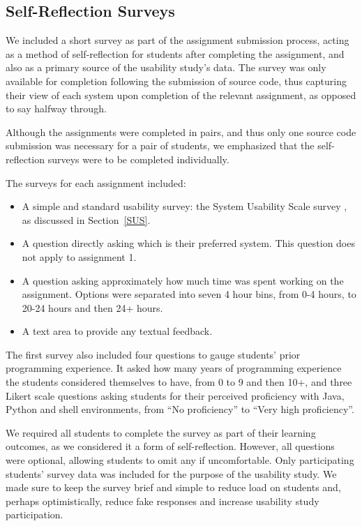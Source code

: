 \subsection{Self-Reflection Surveys}

  We included a short survey as part of the assignment submission process, acting as a method of self-reflection for students after completing the assignment, and also as a primary source of the usability study's data. The survey was only available for completion following the submission of source code, thus capturing their view of each system upon completion of the relevant assignment, as opposed to say halfway through.

  Although the assignments were completed in pairs, and thus only one source code submission was necessary for a pair of students, we emphasized that the self-reflection surveys were to be completed individually.

  The surveys for each assignment included:

  \begin{itemize}
    \item A simple and standard usability survey: the System Usability Scale survey \cite{BROOKE:SUS:1996}, as discussed in Section~\ref{SUS}.
    \item A question directly asking which is their preferred system. This question does not apply to assignment 1.
    \item A question asking approximately how much time was spent working on the assignment. Options were separated into seven 4 hour bins, from 0-4 hours, to 20-24 hours and then 24+ hours.
    \item A text area to provide any textual feedback.
  \end{itemize}
  
  The first survey also included four questions to gauge students' prior programming experience. It asked how many years of programming experience the students considered themselves to have, from 0 to 9 and then 10+, and three Likert scale questions asking students for their perceived proficiency with Java, Python and shell environments, from ``No proficiency'' to ``Very high proficiency''.
  
  We required all students to complete the survey as part of their learning outcomes, as we considered it a form of self-reflection. However, all questions were optional, allowing students to omit any if uncomfortable. Only participating students' survey data was included for the purpose of the usability study. We made sure to keep the survey brief and simple to reduce load on students and, perhaps optimistically, reduce fake responses and increase usability study participation.


